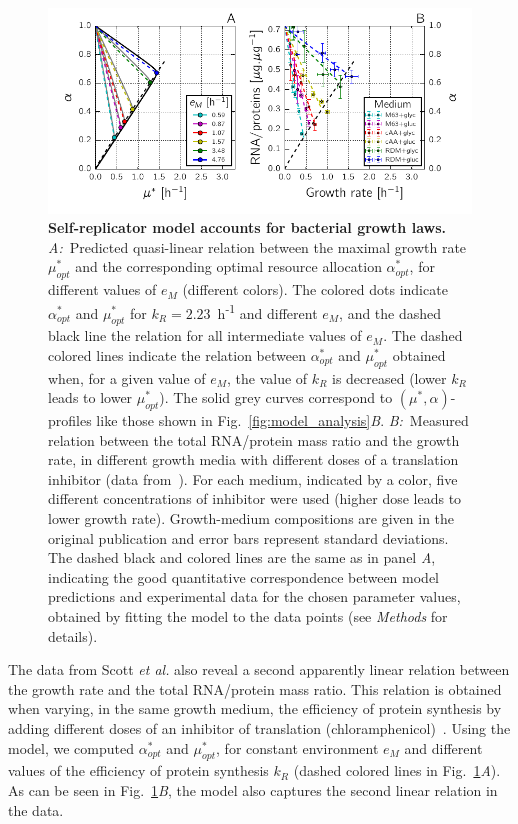 \begin{figure}[p]
\includegraphics[width=\textwidth]{./Fig/Fig3}
\caption{
\textbf{Self-replicator model accounts for bacterial growth laws.}
\textit{A:}~Predicted quasi-linear relation between the maximal growth rate $\mu^{*}_{opt}$ and the corresponding optimal resource allocation $\alpha^*_{opt}$, for different values of $e_M$ (different colors).
The colored dots indicate $\alpha^*_{opt}$ and $\mu^{*}_{opt}$  for $k_R = 2.23$~h\textsuperscript{-1} and different $e_M$, and the dashed black line the relation for all intermediate values of $e_M$.
The dashed colored lines indicate the relation between $\alpha^*_{opt}$ and $\mu^{*}_{opt}$ obtained when, for a given value of $e_M$, the value of $k_R$ is decreased (lower $k_R$ leads to lower $\mu^{*}_{opt}$).
The solid grey curves correspond to $(\mu^*,\alpha)$-profiles like those shown in Fig.~\ref{fig:model_analysis}\textit{B}.
\textit{B:}~Measured relation between the total RNA/protein mass ratio and the growth rate, in different growth media with different doses of a translation inhibitor (data from~\cite{scott_interdependence_2010}).
For each medium, indicated by a color, five different concentrations of inhibitor were used (higher dose leads to lower growth rate).
Growth-medium compositions are given in the original publication and error bars represent standard deviations.
The dashed black and colored lines are the same as in panel \textit{A}, indicating the good quantitative correspondence between model predictions and experimental data for the chosen parameter values, obtained by fitting the model to the data points (see \textit{Methods} for details).
}
\label{fig:model_validation}
\end{figure}

The data from Scott \textit{et al.} also reveal a second apparently linear relation between the growth rate and the total RNA/protein mass ratio.
This relation is obtained when varying, in the same growth medium, the efficiency of protein synthesis by adding different doses of an inhibitor of translation (chloramphenicol)~\cite{scott_interdependence_2010}.
Using the model, we computed $\alpha^*_{opt}$ and $\mu^*_{opt}$, for constant environment $e_M$ and different values of the efficiency of protein synthesis $k_R$ (dashed colored lines in Fig.~\ref{fig:model_validation}\textit{A}).
As can be seen in Fig.~\ref{fig:model_validation}\textit{B}, the model also captures the second linear relation in the data.

